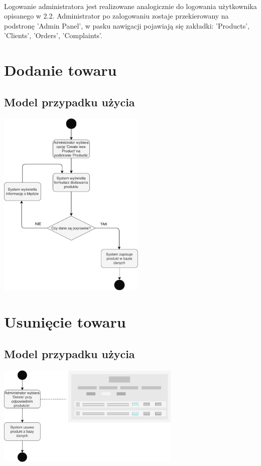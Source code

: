 \documentclass[12pt]{report}
\begin{document}
			\paragraph{} Logowanie administratora jest realizowane analogicznie do logowania użytkownika opisanego w 2.2. Administrator po zalogowaniu zostaje przekierowany na podstronę 'Admin Panel', w pasku nawigacji pojawiają się zakładki: 'Products', 'Clients', 'Orders', 'Complaints'.
		
		
	\section{Dodanie towaru}
		\subsection{Model przypadku użycia}
			\begin{center}
				\includegraphics[width=200pt]{admin_dodaj.pdf}
			\end{center}
	
	\section{Usunięcie towaru}
		\subsection{Model przypadku użycia}
			\begin{center}
				\includegraphics[width=250pt]{usun.pdf}
			\end{center}
	
\end{document}
